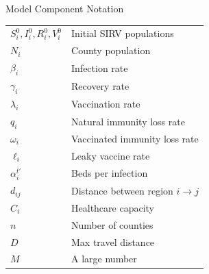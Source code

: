 \documentclass[aspectratio=169,xcolor=dvipsnames]{beamer}
\begin{document}
\begin{frame}{Model Component Notation}
\begin{minipage}[t]{0.48\textwidth}
        \begin{tabular}{|p{}|p{}|}
            \hline
            $S_i^0, I_i^0, R_i^0, V_i^0$ & Initial SIRV populations \\
            $N_i$ & County population \\
            $\beta_i$ & Infection rate \\
            $\gamma_i$ & Recovery rate \\
            $\lambda_i$ & Vaccination rate \\
            $q_i$ & Natural immunity loss rate \\
            $\omega_i$ & Vaccinated immunity loss rate \\
            $\ell_i$ & Leaky vaccine rate \\
            $\alpha_i^{t'}$ & Beds per infection \\
            $d_{ij}$ & Distance between region $i \to j$ \\
            $C_i$ & Healthcare capacity \\
            $n$ & Number of counties \\
            $D$ & Max travel distance \\
            $M$ & A large number \\
            \hline
        \end{tabular}
    \end{minipage}
\end{frame}
\end{document}
